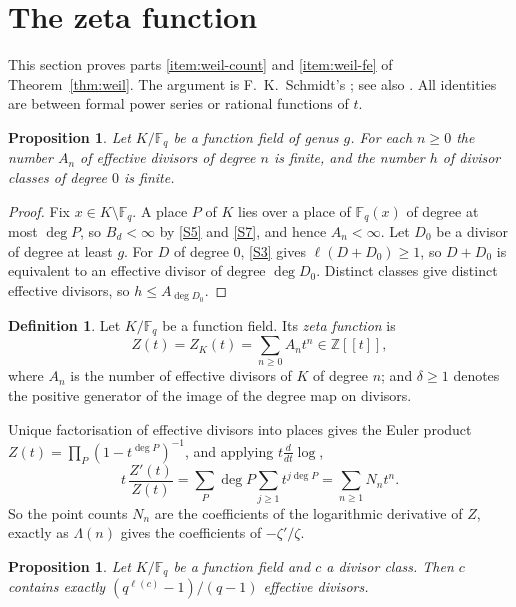 \documentclass[11pt]{amsbook}
\theoremstyle{plain}
\newtheorem{proposition}[theorem]{Proposition}
\theoremstyle{definition}
\newtheorem{definition}[theorem]{Definition}
\theoremstyle{remark}
\numberwithin{equation}{section}
\numberwithin{figure}{chapter}
\numberwithin{table}{chapter}
\newcommand{\Z}{\mathbb{Z}}
\newcommand{\F}{\mathbb{F}}
\begin{document}
\section{The zeta function}
\label{sec:zeta}

This section proves parts \eqref{item:weil-count} and
\eqref{item:weil-fe} of Theorem~\ref{thm:weil}. The argument is
F.~K.~Schmidt's \cite{FKSchmidt1931}; see also
\cite[\S5.1]{Stichtenoth2009}. All identities are between formal
power series or rational functions of $t$.

\begin{proposition}\label{prop:finiteness}
Let $K/\F_q$ be a function field of genus $g$. For each $n\ge0$ the
number $A_n$ of effective divisors of degree $n$ is finite, and the
number $h$ of divisor classes of degree $0$ is finite.
\end{proposition}

\begin{proof}
Fix $x\in K\setminus\F_q$. A place $P$ of $K$ lies over a place of
$\F_q(x)$ of degree at most $\deg P$, so $B_d<\infty$ by \ref{S5}
and \ref{S7}, and hence $A_n<\infty$. Let $D_0$ be a divisor of
degree at least $g$. For $D$ of degree $0$, \ref{S3} gives
$\ell(D+D_0)\ge1$, so $D+D_0$ is equivalent to an effective divisor
of degree $\deg D_0$. Distinct classes give distinct effective
divisors, so $h\le A_{\deg D_0}$.
\end{proof}

\begin{definition}\label{def:zeta}
Let $K/\F_q$ be a function field. Its \emph{zeta function} is
\[
Z(t)=Z_K(t)=\sum_{n\ge0}A_nt^n\in\Z[[t]],
\]
where $A_n$ is the number of effective divisors of $K$ of degree
$n$; and $\delta\ge1$ denotes the positive generator of the image of
the degree map on divisors.
\end{definition}

Unique factorisation of effective divisors into places gives the
Euler product $Z(t)=\prod_P(1-t^{\deg P})^{-1}$, and applying
$t\frac{d}{dt}\log$,
\begin{equation}\label{eq:log-deriv}
t\,\frac{Z'(t)}{Z(t)}=\sum_P\deg P\sum_{j\ge1}t^{j\deg P}
=\sum_{n\ge1}N_nt^n.
\end{equation}
So the point counts $N_n$ are the coefficients of the logarithmic
derivative of $Z$, exactly as $\Lambda(n)$ gives the coefficients of
$-\zeta'/\zeta$.

\begin{proposition}\label{prop:class-count}
Let $K/\F_q$ be a function field and $c$ a divisor class. Then $c$
contains exactly $(q^{\ell(c)}-1)/(q-1)$ effective divisors.
\end{proposition}
\end{document}

